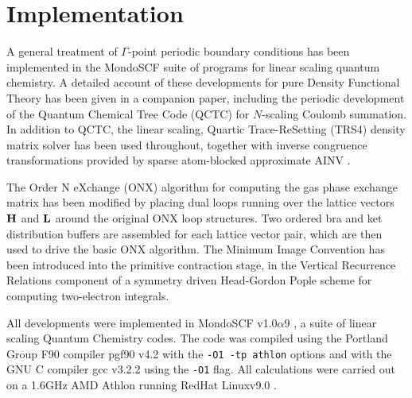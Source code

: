 \commentoutA{\documentclass[prb,aps,nobibnotes,twocolumn,doublespace,twocolumngrid,superbib,showpacs]{revtex4}}
\begin{document}
\section{Implementation}\label{implementation}

A general treatment of $\Gamma$-point periodic boundary conditions has been implemented in the {\sc MondoSCF}\cite{MondoSCF}
suite of programs for linear scaling quantum chemistry.  A detailed account of these developments for 
pure Density Functional Theory has been given in a companion paper\cite{CTymczak04A}, including the periodic 
development of the Quantum Chemical Tree Code ({\sc QCTC}) for $N$-scaling Coulomb summation.  In addition to QCTC, 
the linear scaling, Quartic Trace-ReSetting ({\sc TRS4}) \cite{ANiklasson03} density matrix solver has been used throughout, 
together with inverse congruence transformations provided by sparse atom-blocked approximate {\sc AINV} \cite{MBenzi01}.  

The Order N eXchange ({\sc ONX}) algorithm \cite{ESchwegler97} for computing the gas phase exchange matrix 
has been modified by placing dual loops running over the lattice vectors 
${\bf H}$ and ${\bf L}$ around the original ONX loop structures.  Two ordered bra and ket distribution 
buffers are assembled for each lattice vector pair, which are then used to drive the basic {\sc ONX} algorithm.
The Minimum Image Convention has been introduced into the primitive contraction stage, in the 
Vertical Recurrence Relations component of a symmetry driven Head-Gordon Pople \cite{MHeadgordon88} scheme for 
computing two-electron integrals.  

All developments  were implemented in  {\sc MondoSCF} v1.0$\alpha$9 \cite{MondoSCF}, a suite of 
linear scaling Quantum Chemistry codes.  The code was compiled using the Portland 
Group F90 compiler {\sc pgf90} v4.2 \cite{pgf90} with the {\tt -O1 -tp athlon} options  and with the 
GNU C compiler {\sc gcc} v3.2.2 using the {\tt -O1} flag.  All calculations were carried out on a 
1.6GHz AMD Athlon running RedHat  {\sc Linux}v9.0 \cite{RedHat90}.   
\end{document}
